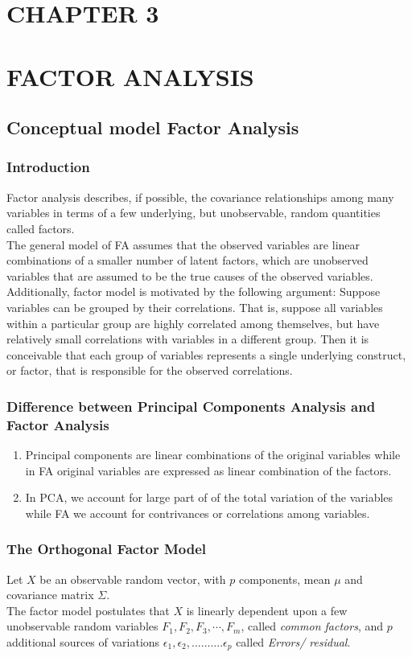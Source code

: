 \documentclass[12]{article}
\begin{document}
\section*{CHAPTER 3}
\section*{FACTOR ANALYSIS}
	\subsection{Conceptual model Factor Analysis}
	\subsubsection{Introduction}
Factor analysis describes, if possible, the covariance 
relationships among many variables in terms of a few underlying, but   unobservable, random quantities called factors. \\
The general model of FA assumes that the observed variables are linear combinations of a smaller number of latent factors, which are unobserved variables that are assumed to be the true causes of the observed variables.\\
Additionally, factor model is motivated by the following argument: Suppose variables can be grouped by their correlations. That is, suppose all variables within a particular group are highly correlated among themselves, but have relatively small correlations with variables in a different group. Then it is conceivable that each group of variables represents a single underlying construct, or factor, that is responsible for the observed correlations. \\

\subsubsection{Difference between Principal Components Analysis and Factor Analysis}
\begin{enumerate}[label=\roman*]
	\item Principal components are linear combinations of the original variables while in FA original variables are expressed as linear combination of the factors.
	\item In PCA, we account for large part of of the total variation of the variables while FA we account for contrivances or correlations among variables.
\end{enumerate}
\subsubsection{The Orthogonal Factor Model}
Let $X$ be an observable random vector, with $p$ components, mean $\mu$ and covariance matrix $\Sigma$. \\
The factor model postulates that $X$ is linearly dependent upon a few unobservable random variables $F_1, F_2, F_3, \cdots, F_m$, called \emph{common factors}, and $p$ additional sources of variations $\epsilon_1, \epsilon_2, ..........\epsilon_p$ called \emph{Errors/ residual}.\\
\end{document}
